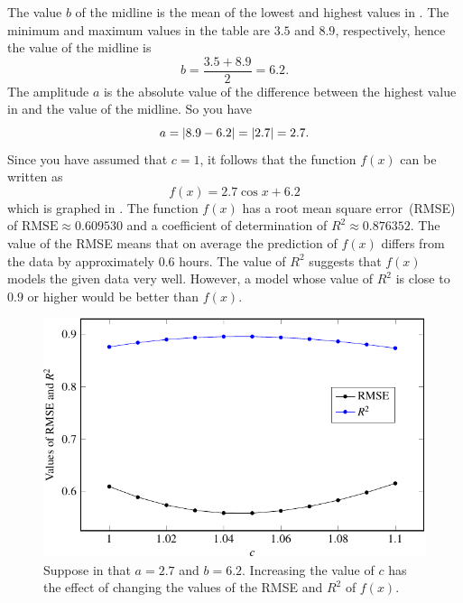 \documentclass[a4paper,oneside,12pt]{article}
\begin{document}
\begin{problem}
{\begin{solution}
The value $b$ of the midline is the mean of the lowest and highest
values in .  The minimum
and maximum values in the table are $3.5$ and $8.9$, respectively,
hence the value of the midline is
\[
b
=
\frac{3.5 + 8.9}{2}
=
6.2.
\]
The amplitude $a$ is the absolute value of the difference between the
highest value in  and the
value of the midline.  So you have
\[
a
=
\lvert8.9 - 6.2\rvert
=
\lvert2.7\rvert
=
2.7.
\]
Since you have assumed that $c = 1$, it follows that the function
$f(x)$ can be written as
\begin{equation}
\label{eqn:trigonometric:mean_daily_sunshine}
f(x)
=
2.7 \cos x + 6.2
\end{equation}
which is graphed in .
The function $f(x)$ has a root mean square error~(RMSE) of
$\text{RMSE} \approx 0.609530$ and a coefficient of determination of
$R^2 \approx 0.876352$.  The value of the RMSE means that on average
the prediction of $f(x)$ differs from the data by approximately $0.6$
hours.  The value of $R^2$ suggests that $f(x)$ models the given data
very well.  However, a model whose value of $R^2$ is close to $0.9$ or
higher would be better than $f(x)$.

\begin{table}[!htbp]
\centering

\caption{%
  Consider the function $f(x) = 2.7 \cos(cx) + 6.2$.  Increasing the
  value of $c$ has the effect of changing the values of the root mean
  square error~(RMSE) and the coefficient of determination of $f(x)$.
}
\label{tab:trigonometric:mean_daily_sunshine_vary_c}
\end{table}

\begin{figure}[!htbp]
\centering
\includegraphics[scale=1.1]{image/13/sunshine-vary-c.pdf}
\caption{%
  Suppose in  that
  $a = 2.7$ and $b = 6.2$.  Increasing the value of $c$ has the effect
  of changing the values of the RMSE and $R^2$ of $f(x)$.
}
\label{fig:trigonometric:mean_daily_sunshine_vary_c}
\end{figure}


\end{solution}}
\end{problem}
\end{document}
